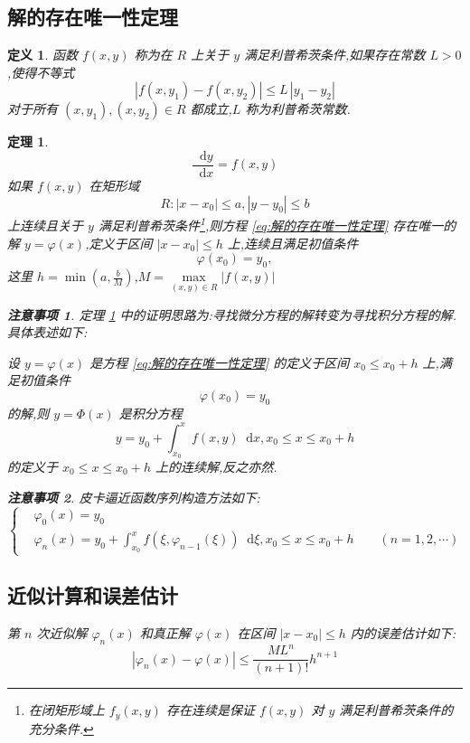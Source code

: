 \documentclass{ctexart}
\newtheorem{attention}{注意事项}
\newtheorem{definition}{定义}[section]
\newtheorem{theorem}{定理}[section]
\newcommand*{\dif}{\mathop{}\!\mathrm{d}}
\numberwithin{equation}{subsection}
\begin{document}
\subsection{解的存在唯一性定理}
\begin{definition}
        函数 $f(x,y)$ 称为在 $R$ 上关于 $y$ 满足利普希茨条件,如果存在常数 $L>0$,使得不等式
        \[|f(x,y_1)-f(x,y_2)|\leqslant L\,|y_1-y_2|\]
        对于所有 $(x,y_1),(x,y_2)\in R$ 都成立,$L$ 称为利普希茨常数.
\end{definition}
\begin{theorem}
        \label{theorem:解的存在唯一性定理}
        \begin{equation}
                \label{eq:解的存在唯一性定理}
                \frac{\dif y}{\dif x}=f(x,y)
        \end{equation}
        如果 $f(x,y)$ 在矩形域 
        \[R:|x-x_0|\leqslant a,|y-y_0|\leqslant b\] 
        上连续且关于 $y$ 满足利普希茨条件\footnote{
        在闭矩形域上 $f_y(x,y)$ 存在连续是保证 $f(x,y)$ 对 $y$ 满足利普希茨条件的充分条件.   
        },则方程 \eqref{eq:解的存在唯一性定理} 存在唯一的解 $y=\varphi(x)$,定义于区间 $|x-x_0|\leqslant h$ 上,连续且满足初值条件
        \begin{equation}
                \label{eq:解的存在唯一性定理:初值条件}
                \varphi(x_0)=y_0,
        \end{equation}
        这里 $h=\min(a,\frac{b}{M})$,$M=\max\limits_{(x,y)\in R}|f(x,y)|$
        \begin{attention}     
                定理 \ref{theorem:解的存在唯一性定理} 中的证明思路为:寻找微分方程的解转变为寻找积分方程的解.具体表述如下:

                设 $y=\varphi(x)$ 是方程 \ref{eq:解的存在唯一性定理} 的定义于区间 $x_0\leqslant x_0+h$ 上,满足初值条件 
                \[\varphi(x_0)=y_0\]
                的解,则 $y=\varPhi(x)$ 是积分方程
                \[y=y_0+\int_{x_0}^xf(x,y)\dif x,x_0\leqslant x\leqslant x_0+h \]
                的定义于 $x_0\leqslant x\leqslant x_0+h$ 上的连续解,反之亦然.
        \end{attention}
        \begin{attention}
                \textcolor[rgb]{1,0,0}{皮卡逼近函数序列构造方法如下:
                \[\left\{\begin{aligned}
                &\varphi_0(x)=y_0\\
                &\varphi_n(x)=y_0+\int_{x_0}^xf(\xi,\varphi_{n-1}(\xi))\dif\xi,x_0\leqslant x\leqslant x_0+h\qquad (n=1,2,\cdots)
        \end{aligned}\right.\]   }
        \end{attention}
        \subsection{近似计算和误差估计}
        第 $n$ 次近似解 $\varphi_n(x)$ 和真正解 $\varphi(x)$ 在区间 $|x-x_0|\leqslant h$ 内的误差估计如下:
        \[|\varphi_n(x)-\varphi(x)|\leqslant\frac{ML^n}{(n+1)!}h^{n+1}\]
\end{theorem}
\end{document}
